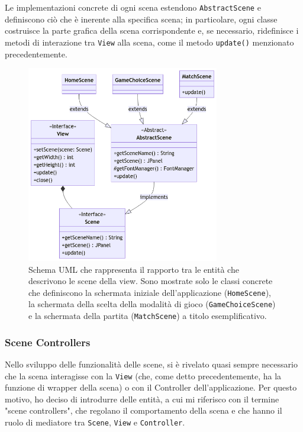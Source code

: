 \documentclass[a4paper,12pt]{report}
\begin{document}
Le implementazioni concrete di ogni scena estendono \texttt{AbstractScene} e definiscono ciò che è inerente alla specifica scena; in particolare, ogni classe costruisce la parte grafica della scena corrispondente e, se necessario, ridefinisce i metodi di interazione tra \texttt{View} alla scena, come il metodo \texttt{update()} menzionato precedentemente.

\begin{figure}[H]
\centering
\includegraphics[width=0.75\textwidth]{images/scenes.png}
\caption{Schema UML che rappresenta il rapporto tra le entità che descrivono le scene della view. Sono mostrate solo le classi concrete che definiscono la schermata iniziale dell'applicazione (\texttt{HomeScene}), la schermata della scelta della modalità di gioco (\texttt{GameChoiceScene}) e la schermata della partita (\texttt{MatchScene}) a titolo esemplificativo.}
\label{images:scenes}
\end{figure}

\subsubsection{Scene Controllers}

Nello sviluppo delle funzionalità delle scene, si è rivelato quasi sempre necessario che la scena interagisse con la \texttt{View} (che, come detto precedentemente, ha la funzione di wrapper della scena) o con il Controller dell'applicazione. Per questo motivo, ho deciso di introdurre delle entità, a cui mi riferisco con il termine "scene controllers", che regolano il comportamento della scena e che hanno il ruolo di mediatore tra \texttt{Scene}, \texttt{View} e \texttt{Controller}.
\end{document}
